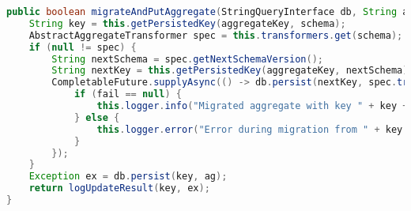 \begin{lstlisting}[language=Java, caption={Metode for håndtering av PUT-spørring i Migrator.}]
public boolean migrateAndPutAggregate(StringQueryInterface db, String aggregateKey, String schema, String ag) {
    String key = this.getPersistedKey(aggregateKey, schema);
    AbstractAggregateTransformer spec = this.transformers.get(schema);
    if (null != spec) {
        String nextSchema = spec.getNextSchemaVersion();
        String nextKey = this.getPersistedKey(aggregateKey, nextSchema);
        CompletableFuture.supplyAsync(() -> db.persist(nextKey, spec.transformAggregate(ag))).thenAccept((fail) -> {
            if (fail == null) {
                this.logger.info("Migrated aggregate with key " + key + " to " + nextKey);
            } else {
                this.logger.error("Error during migration from " + key + " to " + nextKey + ":\n"+ fail.toString());
            }
        });
    }
    Exception ex = db.persist(key, ag);
    return logUpdateResult(key, ex);
}
\end{lstlisting}
